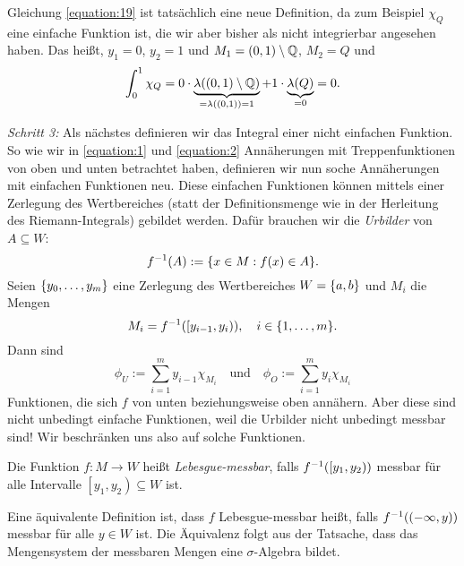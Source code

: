 \begin{remark}
	Gleichung \eqref{equation:19} ist tatsächlich eine neue Definition, da zum Beispiel \(\chi_Q\) eine einfache Funktion ist, die wir aber bisher als nicht integrierbar angesehen haben.
	Das heißt, \(y_1 = 0\), \(y_2 = 1\) und \(M_1 = \parentheses*{0, 1} \setminus \Q\), \(M_2 = Q\) und
	\[
		\int_0^1 \chi_Q = 0 \cdot \underbrace{\lambda\parentheses*{\parentheses*{0, 1} \setminus \Q}}_{= \lambda\parentheses*{\parentheses*{0, 1}} = 1} + 1 \cdot \underbrace{\lambda\parentheses*{Q}}_{= 0} = 0.
	\]
\end{remark}

\emph{Schritt 3:} Als nächstes definieren wir das Integral einer nicht einfachen Funktion.
So wie wir in \eqref{equation:1} und \eqref{equation:2} Annäherungen mit Treppenfunktionen von oben und unten betrachtet haben, definieren wir nun soche Annäherungen mit einfachen Funktionen neu.
Diese einfachen Funktionen können mittels einer Zerlegung des Wertbereiches (statt der Definitionsmenge wie in der Herleitung des Riemann-Integrals) gebildet werden.
Dafür brauchen wir die \emph{Urbilder} von \(A \subseteq W\):
\[
	f^{-1}\parentheses*{A} := \braces*{x \in M : f\parentheses*{x} \in A}.
\]
Seien \(\braces*{y_0, \ldots, y_m}\) eine Zerlegung des Wertbereiches \(W = \braces*{a, b}\) und \(M_i\) die Mengen
\[
	M_i = f^{-1}\parentheses*{\left[y_{i - 1}, y_i\right)}, \quad i \in \braces*{1, \ldots, m}.
\]
Dann sind
\[
	\phi_U := \sum_{i = 1}^m y_{i - 1}\chi_{M_i} \quad \text{und} \quad \phi_O := \sum_{i = 1}^m y_i \chi_{M_i}
\]
Funktionen, die sich \(f\) von unten beziehungsweise oben annähern.
Aber diese sind nicht unbedingt einfache Funktionen, weil die Urbilder nicht unbedingt messbar sind!
Wir beschränken uns also auf solche Funktionen.

\begin{definition}
	Die Funktion \(f: M \to W\) heißt \emph{Lebesgue-messbar}, falls \(f^{-1}\parentheses*{\left[y_1, y_2\right)}\) messbar für alle Intervalle \(\left[y_1, y_2\right) \subseteq W\) ist.
\end{definition}

\begin{remark}
	Eine äquivalente Definition ist, dass \(f\) Lebesgue-messbar heißt, falls \(f^{-1}\parentheses*{\parentheses*{-\infty, y}}\) messbar für alle \(y \in W\) ist.
	Die Äquivalenz folgt aus der Tatsache, dass das Mengensystem der messbaren Mengen eine \(\sigma\)-Algebra bildet.
\end{remark}

